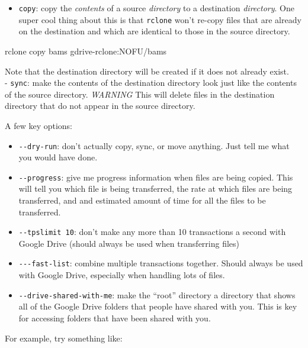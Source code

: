 \documentclass[]{krantz}
\makeatletter
\newenvironment{Shaded}{\begin{snugshade}}{\end{snugshade}}
\newcommand{\ExtensionTok}[1]{#1}
\newcommand{\NormalTok}[1]{#1}
\providecommand{\tightlist}{%
  \setlength{\itemsep}{0pt}\setlength{\parskip}{0pt}}
\newenvironment{kframe}{%
\medskip{}
\setlength{\fboxsep}{.8em}
 \def\at@end@of@kframe{}%
 \ifinner\ifhmode%
  \def\at@end@of@kframe{\end{minipage}}%
  \begin{minipage}{\columnwidth}%
 \fi\fi%
 \def\FrameCommand##1{\hskip\@totalleftmargin \hskip-\fboxsep
 \colorbox{shadecolor}{##1}\hskip-\fboxsep
     \hskip-\linewidth \hskip-\@totalleftmargin \hskip\columnwidth}%
 \MakeFramed {\advance\hsize-\width
   \@totalleftmargin\z@ \linewidth\hsize
   \@setminipage}}%
 {\par\unskip\endMakeFramed%
 \at@end@of@kframe}
\renewenvironment{Shaded}{\begin{kframe}}{\end{kframe}}
\makeatother
\begin{document}
\begin{itemize}
\tightlist
\item
  \texttt{copy}: copy the \emph{contents} of a source \emph{directory} to a destination \emph{directory}. One super cool
  thing about this is that \texttt{rclone} won't re-copy files that are already on the destination and which
  are identical to those in the source directory.
\end{itemize}

\begin{Shaded}
\begin{Highlighting}[]
\ExtensionTok{rclone}\NormalTok{ copy bams gdrive-rclone:NOFU/bams}
\end{Highlighting}
\end{Shaded}

Note that the destination directory will be created if it does not already exist.\\
- \texttt{sync}: make the contents of the destination directory look just like the
contents of the source directory. \emph{WARNING} This will delete files in the destination
directory that do not appear in the source directory.

A few key options:

\begin{itemize}
\tightlist
\item
  \texttt{-\/-dry-run}: don't actually copy, sync, or move anything. Just tell me what you would have done.
\item
  \texttt{-\/-progress}: give me progress information when files are being copied.
  This will tell you which file is being transferred, the rate at which
  files are being transferred, and and estimated amount of time for all the
  files to be transferred.
\item
  \texttt{-\/-tpslimit\ 10}: don't make any more than 10 transactions a second with Google Drive (should always be used when transferring files)
\item
  \texttt{-\/-\/-fast-list}: combine multiple transactions together. Should always be used with Google Drive,
  especially when handling lots of files.
\item
  \texttt{-\/-drive-shared-with-me}: make the ``root'' directory a directory that shows all
  of the Google Drive folders that people have shared with you. This is key for accessing
  folders that have been shared with you.
\end{itemize}

For example, try something like:
\end{document}
